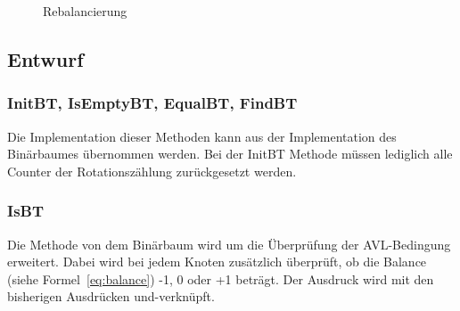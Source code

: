 \begin{figure}[hbt]
\begin{minipage}[c]{.45\textwidth}
{            \label{fig:AVL-Cases}}
    \end{minipage}
    \begin{minipage}[c]{.45\textwidth}
    \end{minipage}
    \caption{Rebalancierung}
    \label{fig:rebalancing}
\end{figure}

\subsection{Entwurf}\label{subsec:entwurf2}

\subsubsection{InitBT, IsEmptyBT, EqualBT, FindBT}
Die Implementation dieser Methoden kann aus der Implementation des Binärbaumes übernommen werden.
Bei der InitBT Methode müssen lediglich alle Counter der Rotationszählung zurückgesetzt werden.

\subsubsection{IsBT}\label{par:avl-isBT}
Die Methode von dem Binärbaum wird um die Überprüfung der AVL-Bedingung erweitert.
Dabei wird bei jedem Knoten zusätzlich überprüft, ob die Balance (siehe Formel~\ref{eq:balance})
-1, 0 oder +1 beträgt.
Der Ausdruck wird mit den bisherigen Ausdrücken und-verknüpft.

